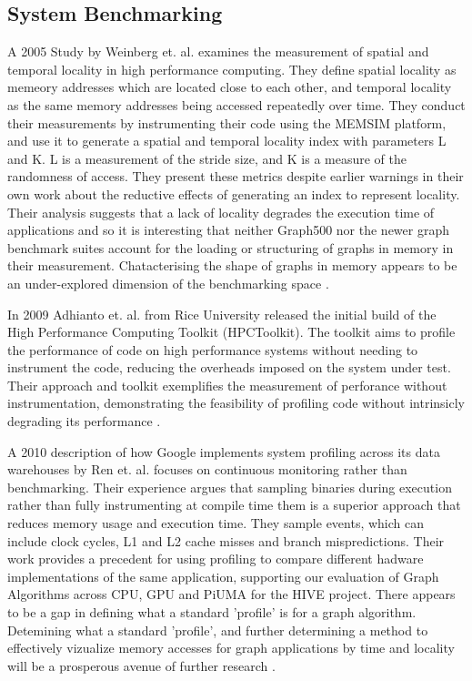 \documentclass[sigconf,anonymous, authordraft]{acmart}
\begin{document}
\subsection{System Benchmarking}

\par{A 2005 Study by Weinberg et. al. examines the measurement of spatial and temporal locality in high performance computing. 
They define spatial locality as memeory addresses which are located close to each other, and temporal locality as the same memory addresses being accessed repeatedly over time. 
They conduct their measurements by instrumenting their code using the MEMSIM platform, and use it to generate a spatial and temporal locality index with parameters L and K. 
L is a measurement of the stride size, and K is a measure of the randomness of access. 
They present these metrics despite earlier warnings in their own work about the reductive effects of generating an index to represent locality. 
Their analysis suggests that a lack of locality degrades the execution time of applications and so it is interesting that neither Graph500 nor the newer graph benchmark suites account for the loading or structuring of graphs in memory in their measurement. 
Chatacterising the shape of graphs in memory appears to be an under-explored dimension of the benchmarking space \cite{Weinberg2005}.}

\par{In 2009 Adhianto et. al. from Rice University released the initial build of the High Performance Computing Toolkit (HPCToolkit). 
The toolkit aims to profile the performance of code on high performance systems without needing to instrument the code, reducing the overheads imposed on the system under test. 
Their approach and toolkit exemplifies the measurement of perforance without instrumentation, demonstrating the feasibility of profiling code without intrinsicly degrading its performance \cite{Adhianto2010}.}

\par{A 2010 description of how Google implements system profiling across its data warehouses by Ren et. al. focuses on continuous monitoring rather than benchmarking.  
Their experience argues that sampling binaries during execution rather than fully instrumenting at compile time them is a superior approach that reduces memory usage and execution time. 
They sample events, which can include clock cycles, L1 and L2 cache misses and branch mispredictions. 
Their work provides a precedent for using profiling to compare different hadware implementations of the same application, supporting our evaluation of Graph Algorithms across CPU, GPU and PiUMA for the HIVE project. 
There appears to be a gap in defining what a standard 'profile' is for a graph algorithm. 
Detemining what a standard 'profile', and further determining a method to effectively vizualize memory accesses for graph applications by time and locality will be a prosperous avenue of further research \cite{Ren2010}.}
\end{document}
